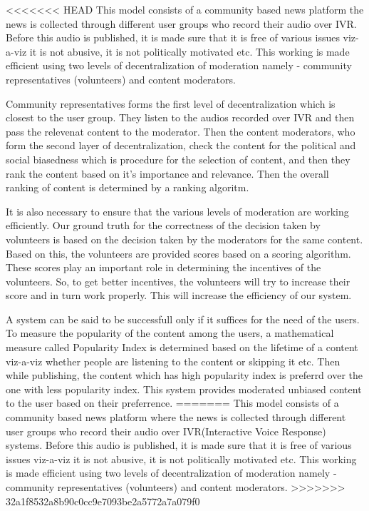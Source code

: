 \documentclass[11pt]{article}
\begin{document}
    
    
<<<<<<< HEAD
    This model consists of a community based news platform the news is collected through different user groups who record their audio over IVR. Before this audio is published, it is made sure that it is free of various issues viz-a-viz it is not abusive, it is not politically motivated etc. This working is made efficient using two levels of decentralization of moderation namely - community representatives (volunteers) and content moderators.

Community representatives forms the first level of decentralization which is closest to the user group. They listen to the audios recorded over IVR and then pass the relevenat content to the moderator. Then the content moderators, who form the second layer of decentralization, check the content for the political and social biasedness which is procedure for the selection of content, and then they rank the content based on it's importance and relevance. Then the overall ranking of content is determined by a ranking algoritm.

It is also necessary to ensure that the various levels of moderation are working efficiently. Our ground truth for the correctness of the decision taken by volunteers is based on the decision taken by the moderators for the same content. Based on this, the volunteers are provided scores based on a scoring algorithm. These scores play an important role in determining the incentives of the volunteers. So, to get better incentives, the volunteers will try to increase their score and in turn work properly. This will increase the efficiency of our system.

A system can be said to be successfull only if it suffices for the need of the users. To measure the popularity of the content among the users, a mathematical measure called Popularity Index is determined based on the lifetime of a content viz-a-viz whether people are listening to the content or skipping it etc. Then while publishing, the content which has high popularity index is preferrd over the one with less popularity index. This system provides moderated unbiased content to the user based on their preferrence.
=======
    This model consists of a community based news platform where the news is collected through different user groups who record their audio over IVR(Interactive Voice Response) systems. Before this audio is published, it is made sure that it is free of various issues viz-a-viz it is not abusive, it is not politically motivated etc. This working is made efficient using two levels of decentralization of moderation namely - community representatives (volunteers) and content moderators.\newline
>>>>>>> 32a1f8532a8b90c0cc9e7093be2a5772a7a079f0
    
\end{document}
